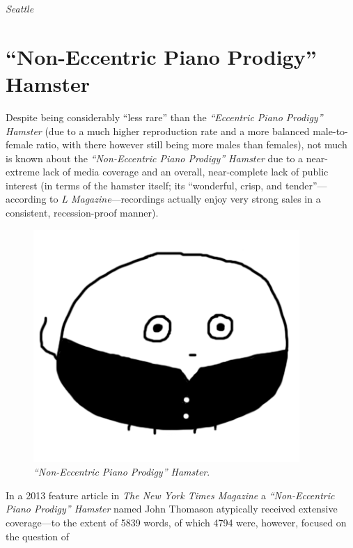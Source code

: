\documentclass[10pt,twoside,openright]{memoir}
\begin{document}
\hspace{7em} {\em Seattle}

\chapter*{``Non-Eccentric Piano Prodigy'' Hamster}

Despite being considerably ``less rare'' than the {\em ``Eccentric Piano
Prodigy'' Hamster} (due to a much higher reproduction rate and a more balanced
male-to-female ratio, with there however still being more males than females),
not much is known about the {\em ``Non-Eccentric Piano Prodigy'' Hamster} due to
a near-extreme lack of media coverage and an overall, near-complete lack of
public interest (in terms of the hamster itself; its ``wonderful, crisp, and
tender''---according to {\em L Magazine}---recordings actually enjoy very
strong sales in a consistent, recession-proof manner). 
\begin{figure}[t!]
\begin{center}
\includegraphics[width=0.9\textwidth]{img/noneccentricpianoprodigy}
\end{center}
\caption*{{\em ``Non-Eccentric Piano Prodigy'' Hamster}.}
\end{figure}
In a 2013 feature article
in {\em The New York Times Magazine} a {\em ``Non-Eccentric Piano Prodigy'' 
Hamster} named John Thomason atypically received extensive coverage---to the 
extent of 5839 words, of which 4794 were, however, focused on the question of 
\end{document}
